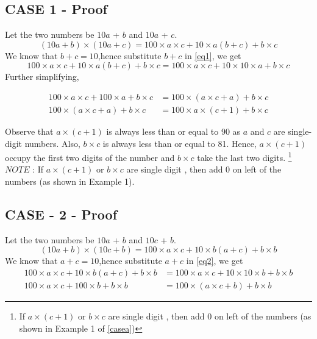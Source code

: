 \documentclass[a4paper,10pt]{article}
\begin{document}
\subsection{\textbf{CASE 1} - \textbf{Proof}}


Let the two numbers be $10a$ + $b$ and $10a$ + $c$. 
\begin{equation}
\label{eq1}
    (10a + b)\times(10a + c)=100\times a \times c + 10\times a(b+c) + b\times c
\end{equation}
We know that $b+c = 10$,hence substitute $b+c$ in \ref{eq1}, we get
\begin{equation}
100\times a \times c + 10\times a(b+c) + b\times c=100\times a \times c + 10\times 10\times a + b\times c 
\end{equation}
Further simplifying,

\begin{align}
100\times a \times c + 100\times a + b\times c &= 100\times (a \times c + a) + b\times c \\
 100\times (a \times c + a) + b\times c &= 100\times a \times (c + 1) + b\times c
\end{align}


Observe that $a \times (c + 1)$ is always less than or equal to 90 as $a$ and $c$ are single-digit numbers. Also, $b \times
c $ is always less than or equal to 81. Hence, $a \times (c + 1)$ occupy the first two digits of the number and $b\times c$ take the last two digits. \footnote{If $a \times (c + 1)$ or $b\times c$ are single digit , then add 0 on left of the numbers (as shown in Example 1 of \ref{casea})} \newline
$NOTE$ : If $a \times (c + 1)$ or $b\times c$ are single digit , then add 0 on left of the numbers (as shown in Example 1).

\subsection{\textbf{CASE - 2} - \textbf{Proof}}


Let the two numbers be $10a$ + $b$ and $10c$ + $b$. 
\begin{equation}
\label{eq2}
    (10a + b)\times(10c + b)=100\times a \times c + 10\times b(a+c) + b\times b
\end{equation}
We know that $a+c = 10$,hence substitute $a+c$ in \ref{eq2}, we get
\begin{align}
100\times a \times c + 10\times b(a+c) + b\times b &= 100\times a \times c + 10\times 10\times b + b\times b 
\\
100\times a \times c + 100\times b + b\times b 
&= 100\times (a \times c + b) + b\times b
\end{align}
\end{document}
